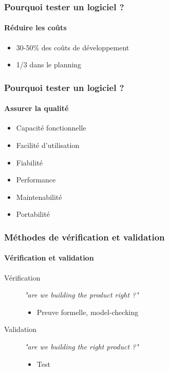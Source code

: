\documentclass{beamer}
\begin{document}
\begin{frame}
	\frametitle{Pourquoi tester un logiciel ?}
	\framesubtitle{R\'{e}duire les co\^{u}ts}
		\begin{itemize}
			\item 30-50\% des co\^{u}ts de d\'{e}veloppement
			\item 1/3 dans le planning
		\end{itemize}	
\end{frame}

\begin{frame}
	\frametitle{Pourquoi tester un logiciel ?}
	\framesubtitle{Assurer la qualit\'{e}}
		\begin{itemize}
			\item Capacit\'{e} fonctionnelle
			\item Facilit\'{e} d'utilisation
			\item Fiabilit\'{e}
			\item Performance
			\item Maintenabilit\'{e}
			\item Portabilit\'{e}
		\end{itemize}
\end{frame}


\begin{frame}
	\frametitle{M\'{e}thodes de v\'{e}rification et validation}
	\framesubtitle{V\'{e}rification et validation}
		\begin{description}
		\item[V\'{e}rification] \textit{"are we building the product right ?"} 
			\begin{itemize}
				\item Preuve formelle, model-checking
			\end{itemize}	
			\bigskip			
		\item[Validation] \textit{"are we building the right product ?"} 
			\begin{itemize}
				\item Test
			\end{itemize}
		\end{description}
\end{frame}
\end{document}
